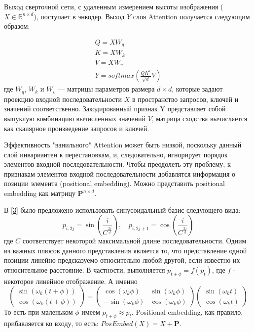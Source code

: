 Выход сверточной сети, с удаленным измерением высоты изображения ($X \in \mathbb{R} ^ {n \times d}$), поступает в энкодер. Выход $Y$ слоя Attention получается следующим образом:

\begin{equation}
\begin{split}
	Q = X W_q \\
	K = X W_k \\
	V = X W_v \\
	Y = softmax(\frac{Q K^T}{\sqrt{d}}V)
\end{split}
\end{equation}
где $W_q$, $W_k$ и $W_v$ — матрицы параметров размера $d \times d$, которые задают проекцию входной последовательности $X$ в пространство запросов, ключей и значений соответственно. Закодированный признак Y представляет собой выпуклую комбинацию вычисленных значений $V$, матрица  сходства вычисляется как скалярное произведение запросов и ключей.

Эффективность "ванильного" Attention может быть низкой, поскольку данный слой инвариантен к перестановкам, и, следовательно, игнорирует порядок элементов входной последовательности. Чтобы преодолеть эту проблему, к признакам элементов входной последовательности добавлятся информация о позиции элемента (positional embedding). Можно представить positional embedding как матрицу $\mathbf{P}^{n \times d}$.

В \hyperlink{cite.Vas17}{[3]} было предложено использовать синусоидальный базис следующего вида:
\begin{equation}
	p_{i,2j} = \sin(\frac{i}{C^{\frac{2j}{d}}}), \quad p_{i,2j+1} = \cos(\frac{i}{C^{\frac{2j}{d}}}) 
\end{equation}
где $C$ соответствует некоторой максимальной длине последовательности. Одним из важных плюсов данного представления является то, что представление одной позиции линейно предсказуемо относительно любой другой, если известно их относительное расстояние. В частности, выполняется $p_{t+ \phi} = f (p_t)$, где $f$ - некоторое линейное отображение. А именно
\begin{equation}
\begin{pmatrix}
	\sin(\omega_k (t + \phi)) \\
	\cos(\omega_k (t + \phi))
\end{pmatrix} = 
\begin{pmatrix}
	\cos (\omega_k \phi)  & \sin (\omega_k \phi) \\
	-\sin (\omega_k \phi) & \cos (\omega_k \phi)
\end{pmatrix}
\begin{pmatrix}
	\sin(\omega_k t) \\
	\cos(\omega_k t)
\end{pmatrix}
\end{equation}
То есть при маленьком $\phi$ имеем $p_{t + \phi} \approx p_t$. Positional embedding, как правило, прибавляется ко входу, то есть:
$PosEmbed(X) = X + \mathbf{P}$.

